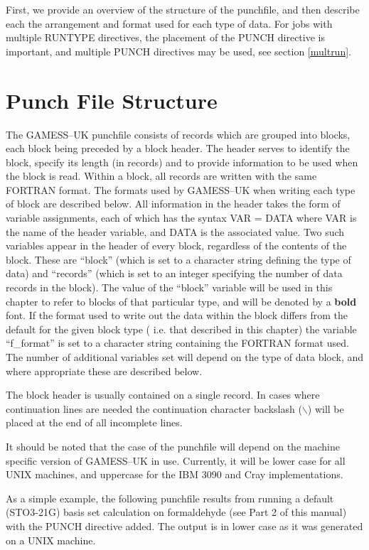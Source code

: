 \documentclass[11pt,fleqn]{article}
\begin{document}
First, we provide an overview of the structure of
the punchfile, and then describe each the arrangement and format
used for each type of data. For jobs with multiple RUNTYPE directives,
the placement of the PUNCH directive is important, and
multiple PUNCH directives may be used, see section \ref{multrun}.

\section[Punch File Structure]{Punch File Structure}

The GAMESS--UK punchfile consists of records which are grouped into blocks, each block
being preceded by a block header. The header serves to identify the block, specify its
length (in records) and
to provide information to be used when the block is read. Within a block,
all records are written with the same FORTRAN format. The formats
used by GAMESS--UK when writing each type of block are described below.
All information in the header takes the form of variable assignments,
each of which has the syntax VAR = DATA where VAR is the name of the 
header variable, and DATA is the associated value. 
Two such variables appear in the header of every block, regardless of the
contents of the block.
These are ``block'' (which is set to a character 
string defining the type of data) and ``records'' (which is set to an integer 
specifying the number of data records in the block). The value of the ``block'' variable
will be used in this chapter to refer to blocks of that particular type, and will
be denoted by a {\bf bold} font. If the format used to write out the data within
the block differs from the default for the given block type ( i.e. that described
in this chapter) the variable ``f\_format'' is set to a character string containing
the FORTRAN format used.
The number of additional variables set will depend on the type of data block,
and where appropriate these are described below.

The block header is usually contained on a single record. In cases where
continuation lines are needed
the continuation character backslash 
($\backslash$) will be  placed at the end of all incomplete lines.

It should be noted that the case of the punchfile will depend on 
the machine specific version of GAMESS--UK in use. Currently, it will
be lower case for all UNIX machines, and uppercase for the
IBM 3090 and Cray implementations.

As a simple example, the following punchfile results from running a default (STO3-21G) basis
set calculation on formaldehyde (see Part 2 of this manual) with the PUNCH 
directive added. The output is in lower case as it was generated on a UNIX machine.
\end{document}

